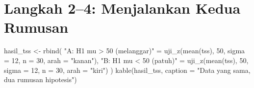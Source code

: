 \documentclass[
  indonesian,
  letterpaper,
]{book}
\newenvironment{Shaded}{\begin{snugshade}}{\end{snugshade}}
\newcommand{\AttributeTok}[1]{\textcolor[rgb]{0.40,0.45,0.13}{#1}}
\newcommand{\DecValTok}[1]{\textcolor[rgb]{0.68,0.00,0.00}{#1}}
\newcommand{\FunctionTok}[1]{\textcolor[rgb]{0.28,0.35,0.67}{#1}}
\newcommand{\NormalTok}[1]{\textcolor[rgb]{0.00,0.23,0.31}{#1}}
\newcommand{\OtherTok}[1]{\textcolor[rgb]{0.00,0.23,0.31}{#1}}
\newcommand{\StringTok}[1]{\textcolor[rgb]{0.13,0.47,0.30}{#1}}
\begin{document}
\section{Langkah 2--4: Menjalankan Kedua
Rumusan}\label{langkah-24-menjalankan-kedua-rumusan}

\begin{Shaded}
\begin{Highlighting}[]
\NormalTok{hasil\_tss }\OtherTok{\textless{}{-}} \FunctionTok{rbind}\NormalTok{(}
  \StringTok{"A: H1 mu \textgreater{} 50 (melanggar)"} \OtherTok{=} \FunctionTok{uji\_z}\NormalTok{(}\FunctionTok{mean}\NormalTok{(tss), }\DecValTok{50}\NormalTok{, }\AttributeTok{sigma =} \DecValTok{12}\NormalTok{, }\AttributeTok{n =} \DecValTok{30}\NormalTok{, }\AttributeTok{arah =} \StringTok{"kanan"}\NormalTok{),}
  \StringTok{"B: H1 mu \textless{} 50 (patuh)"}     \OtherTok{=} \FunctionTok{uji\_z}\NormalTok{(}\FunctionTok{mean}\NormalTok{(tss), }\DecValTok{50}\NormalTok{, }\AttributeTok{sigma =} \DecValTok{12}\NormalTok{, }\AttributeTok{n =} \DecValTok{30}\NormalTok{, }\AttributeTok{arah =} \StringTok{"kiri"}\NormalTok{)}
\NormalTok{)}
\FunctionTok{kable}\NormalTok{(hasil\_tss, }\AttributeTok{caption =} \StringTok{"Data yang sama, dua rumusan hipotesis"}\NormalTok{)}
\end{Highlighting}
\end{Shaded}
\end{document}
